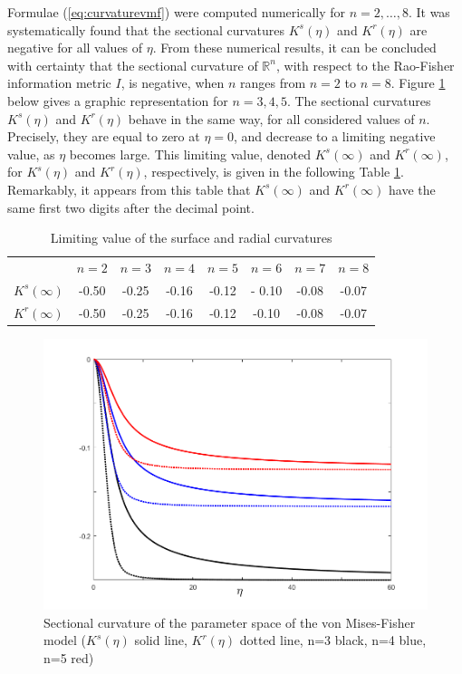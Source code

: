 \documentclass{svmult}
\begin{document}
Formulae (\ref{eq:curvaturevmf}) were computed numerically for $n = 2,\ldots,8$. It was systematically found that the sectional curvatures $K^s(\eta)$ and $K^r(\eta)$ are negative for all values of $\eta$. From these numerical results, it can be concluded with certainty that the sectional curvature of $\mathbb{R}^n$, with respect to the Rao-Fisher information metric $I$, is negative, when $n$ ranges from $n=2$ to $n=8$. Figure \ref{fig1} below gives a graphic representation for $n = 3,4,5$. The sectional curvatures $K^s(\eta)$ and $K^r(\eta)$ behave in the same way, for all considered values of $n$. Precisely, they are equal to zero at $\eta = 0$, and decrease to a limiting negative value, as $\eta$ becomes large. This limiting value, denoted $K^s(\infty)$ and $K^r(\infty)$, for $K^s(\eta)$ and $K^r(\eta)$, respectively, is given in the following Table \ref{table}. Remarkably, it appears from this table that $K^s(\infty)$ and $K^r(\infty)$ have the same first two digits after the decimal point. %
\begin{table}[!h]
\begin{center} 
\begin{tabular}{lccccccc}
                    & $n=2$ & $n=3$ & $n=4$ & $n=5$ & $n=6$ & $n=7$ & $n=8$ \\[0.1cm] 
$K^s(\infty)$ &  -0.50 & -0.25 & -0.16 & -0.12 & - 0.10 & -0.08 & -0.07\\[0.12cm]
$K^r(\infty)$ & -0.50 & -0.25 & -0.16 & -0.12 & -0.10 & -0.08 &  -0.07\\
\end{tabular}
\caption{Limiting value of the surface and radial curvatures}
\label{table}
\end{center}
\end{table}
\begin{figure} [!b]
  \centering
  \includegraphics[width=0.9\linewidth]{Figures/nxky}
\caption{Sectional curvature of the parameter space of the von Mises-Fisher model ($K^s(\eta)$ solid line, $K^r(\eta)$ dotted line, n=3 black, n=4 blue, n=5 red)}
\label{fig1}
\end{figure}
    
\end{document}
